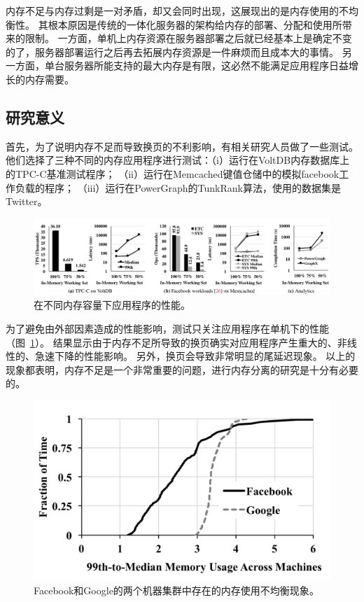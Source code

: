 内存不足与内存过剩是一对矛盾，却又会同时出现，这展现出的是内存使用的不均衡性。
其根本原因是传统的一体化服务器的架构给内存的部署、分配和使用所带来的限制。
一方面，单机上内存资源在服务器部署之后就已经基本上是确定不变的了，服务器部署运行之后再去拓展内存资源是一件麻烦而且成本大的事情。
另一方面，单台服务器所能支持的最大内存是有限，这必然不能满足应用程序日益增长的内存需要。

\subsection{研究意义}
首先，为了说明内存不足而导致换页的不利影响，有相关研究人员做了一些测试\cite{gu2017efficient}。
他们选择了三种不同的内存应用程序进行测试：（i）运行在VoltDB内存数据库上的TPC-C基准测试程序；
（ii）运行在Memcached键值仓储中的模拟facebook工作负载的程序；
（iii）运行在PowerGraph的TunkRank算法，使用的数据集是Twitter。

\begin{figure}
\centering
\includegraphics[scale=0.45]{Figures/memory/memory_motivation1.png}
\decoRule
\caption{在不同内存容量下应用程序的性能\cite{gu2017efficient}。}
\label{fig:memory_motivation1}
\end{figure}

为了避免由外部因素造成的性能影响，测试只关注应用程序在单机下的性能（图~\ref{fig:memory_motivation1}）。
结果显示由于内存不足所导致的换页确实对应用程序产生重大的、非线性的、急速下降的性能影响。
另外，换页会导致非常明显的尾延迟现象。
以上的现象都表明，内存不足是一个非常重要的问题，进行内存分离的研究是十分有必要的。

\begin{figure}
\centering
\includegraphics[scale=0.6]{Figures/memory/memory_motivation2.png}
\decoRule
\caption{Facebook和Google的两个机器集群中存在的内存使用不均衡现象\cite{gu2017efficient}。}
\label{fig:memory_motivation2}
\end{figure}

